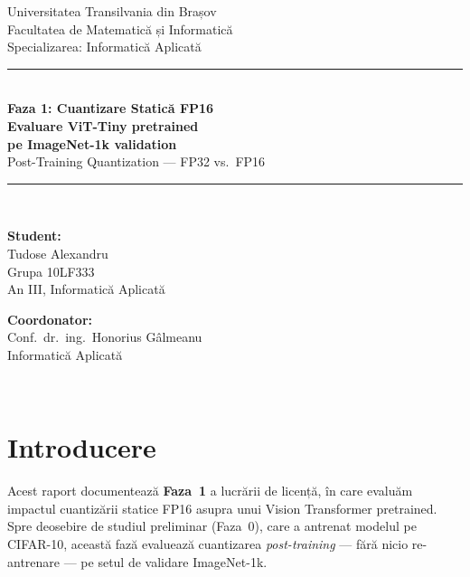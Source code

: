 \documentclass[12pt,a4paper]{article}
\begin{document}

\begin{titlepage}
  \centering
  {\large Universitatea Transilvania din Brașov\\}
  {\small Facultatea de Matematică și Informatică\\}
  {\small Specializarea: Informatică Aplicată\\[2cm]}

  \rule{\linewidth}{0.4pt}\\[0.5cm]
  {\LARGE\bfseries Faza 1: Cuantizare Statică FP16\\[0.3cm]}
  {\Large\bfseries Evaluare ViT-Tiny pretrained\\[0.2cm]}
  {\Large\bfseries pe ImageNet-1k validation\\[0.2cm]}
  {\large Post-Training Quantization --- FP32 vs.\ FP16}\\[0.3cm]
  \rule{\linewidth}{0.4pt}\\[2cm]

  \begin{minipage}{0.45\textwidth}
    \textbf{Student:}\\
    Tudose Alexandru\\
    Grupa 10LF333\\
    An III, Informatică Aplicată
  \end{minipage}
  \hfill
  \begin{minipage}{0.45\textwidth}
    \raggedleft
    \textbf{Coordonator:}\\
    Conf.\ dr.\ ing.\ Honorius Gâlmeanu\\
    Informatică Aplicată
  \end{minipage}\\[3cm]

\end{titlepage}

\tableofcontents
\newpage

\section{Introducere}

Acest raport documentează \textbf{Faza~1} a lucrării de licență, în care
evaluăm impactul cuantizării statice FP16 asupra unui Vision Transformer
pretrained. Spre deosebire de studiul preliminar (Faza~0), care a antrenat
modelul pe CIFAR-10, această fază evaluează cuantizarea \emph{post-training}
--- fără nicio re-antrenare --- pe setul de validare ImageNet-1k.
\end{document}
